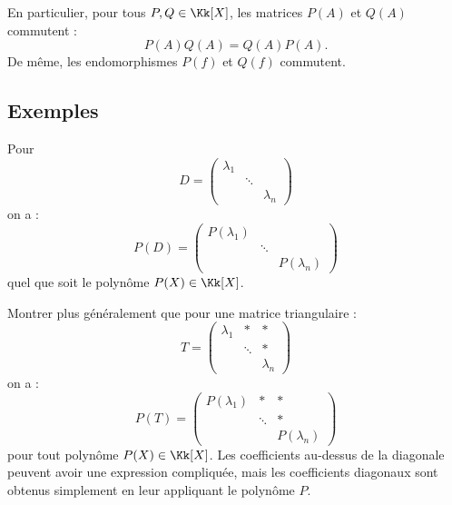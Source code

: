 \documentclass[12pt, class=report,crop=false]{standalone}
\begin{document}
\begin{remarque*}[importante]
En particulier, pour tous $P,Q \in \Kk[X]$, les matrices $P(A)$ et $Q(A)$ commutent :
\[P(A) Q(A) = Q(A)P(A).\]
De même, les endomorphismes $P(f)$ et $Q(f)$ commutent.
\end{remarque*}


\subsection{Exemples}


\begin{exemple}
Pour 
\[D = \begin{pmatrix} 
\lambda_1& &\\
&\ddots&\\
&& \lambda_n
\end{pmatrix}\]
on a :
\[P(D) = \begin{pmatrix} 
P(\lambda_1)& &\\
&\ddots&\\
&& P(\lambda_n)
\end{pmatrix}\]
quel que soit le polynôme $P(X) \in \Kk[X]$.
\end{exemple}


\begin{exemple}
Montrer plus généralement que pour une matrice triangulaire :
\[T =\begin{pmatrix} 
\lambda_1& * & *\\
&\ddots& * \\
&& \lambda_n\end{pmatrix}\]
on a :
\[P(T) = \begin{pmatrix} 
P(\lambda_1)& * & * \\
&\ddots & * \\
&& P(\lambda_n)
\end{pmatrix}\]
pour tout polynôme $P(X)  \in \Kk[X]$. 
Les coefficients au-dessus de la diagonale peuvent avoir une expression compliquée, mais les coefficients diagonaux sont obtenus simplement en leur appliquant le polynôme $P$.
\end{exemple}
\end{document}
